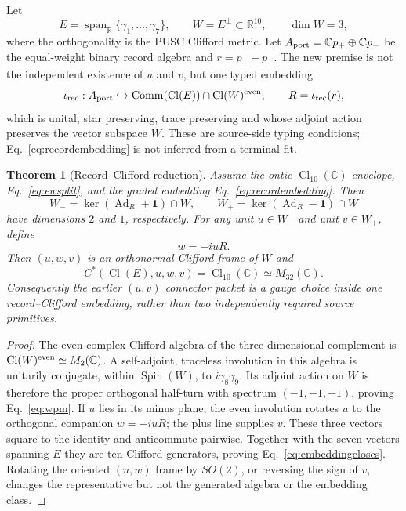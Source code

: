 \documentclass[11pt,a4paper]{article}
\newtheorem{theorem}[definition]{Theorem}
\theoremstyle{remark}
\newcommand{\id}{\mathbf 1}
\begin{document}
Let
\begin{equation}
 E=\operatorname{span}_{\mathbb R}\{\gamma_1,\ldots,\gamma_7\},
 \qquad W=E^\perp\subset\mathbb R^{10},
 \qquad \dim W=3,
 \label{eq:ewsplit}
\end{equation}
where the orthogonality is the PUSC Clifford metric.  Let
$A_{\rm port}=\mathbb Cp_+\oplus\mathbb Cp_-$ be the equal-weight binary
record algebra and $r=p_+-p_-$.  The new premise is not the independent
existence of $u$ and $v$, but one typed embedding
\begin{equation}
 \iota_{\rm rec}:A_{\rm port}\hookrightarrow
 \operatorname{Comm}(\operatorname{Cl}(E))\cap
 \operatorname{Cl}(W)^{\rm even},
 \qquad R=\iota_{\rm rec}(r),
 \label{eq:recordembedding}
\end{equation}
which is unital, star preserving, trace preserving and whose adjoint action
preserves the vector subspace $W$.  These are source-side typing conditions;
Eq.~\eqref{eq:recordembedding} is not inferred from a terminal fit.

\begin{theorem}[Record--Clifford reduction]
Assume the ontic $\operatorname{Cl}_{10}(\mathbb C)$ envelope,
Eq.~\eqref{eq:ewsplit}, and the graded embedding
Eq.~\eqref{eq:recordembedding}.  Then
\begin{equation}
 W_-=\ker(\operatorname{Ad}_R+\id)\cap W,
 \qquad
 W_+=\ker(\operatorname{Ad}_R-\id)\cap W
 \label{eq:wpm}
\end{equation}
have dimensions $2$ and $1$, respectively.  For any unit
$u\in W_-$ and unit $v\in W_+$, define
\begin{equation}
 w=-iuR.
 \label{eq:companion}
\end{equation}
Then $(u,w,v)$ is an orthonormal Clifford frame of $W$ and
\begin{equation}
 C^*(\operatorname{Cl}(E),u,w,v)
 =\operatorname{Cl}_{10}(\mathbb C)\simeq M_{32}(\mathbb C).
 \label{eq:embeddingcloses}
\end{equation}
Consequently the earlier $(u,v)$ connector packet is a gauge choice inside
one record--Clifford embedding, rather than two independently required source
primitives.
\end{theorem}

\begin{proof}
The even complex Clifford algebra of the three-dimensional complement is
$\operatorname{Cl}(W)^{\rm even}\simeq M_2(\mathbb C)$.  A self-adjoint,
traceless involution in this algebra is unitarily conjugate, within
$\operatorname{Spin}(W)$, to $i\gamma_8\gamma_9$.  Its adjoint action on
$W$ is therefore the proper orthogonal half-turn with spectrum
$(-1,-1,+1)$, proving Eq.~\eqref{eq:wpm}.  If $u$ lies in its minus plane,
the even involution rotates $u$ to the orthogonal companion
$w=-iuR$; the plus line supplies $v$.  These three vectors square to the
identity and anticommute pairwise.  Together with the seven vectors spanning
$E$ they are ten Clifford generators, proving
Eq.~\eqref{eq:embeddingcloses}.  Rotating the oriented $(u,w)$ frame by
$SO(2)$, or reversing the sign of $v$, changes the representative but not the
generated algebra or the embedding class.
\end{proof}
\end{document}
